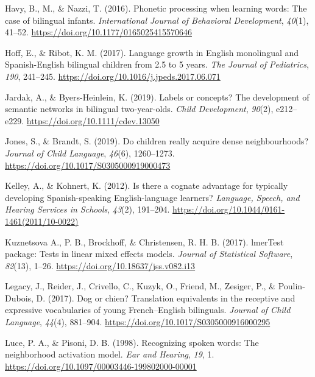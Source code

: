 \documentclass[
  ,man,floatsintext]{apa6}
\newlength{\cslhangindent}
\newlength{\cslentryspacingunit} %
\newenvironment{CSLReferences}[2] %
 {%
  \setlength{\parindent}{0pt}
  \ifodd #1
  \let\oldpar\par
  \def\par{\hangindent=\cslhangindent\oldpar}
  \fi
  \setlength{\parskip}{#2\cslentryspacingunit}
 }%
 {}
\begin{document}
\begin{CSLReferences}{1}{0}
\leavevmode{}%
Havy, B., M., \& Nazzi, T. (2016). Phonetic processing when learning words: The case of bilingual infants. \emph{International Journal of Behavioral Development}, \emph{40}(1), 41--52. \url{https://doi.org/10.1177/0165025415570646}

\leavevmode{}%
Hoff, E., \& Ribot, K. M. (2017). Language growth in {E}nglish monolingual and {S}panish-{E}nglish bilingual children from 2.5 to 5 years. \emph{The Journal of Pediatrics}, \emph{190}, 241--245. \url{https://doi.org/10.1016/j.jpeds.2017.06.071}

\leavevmode{}%
Jardak, A., \& Byers-Heinlein, K. (2019). Labels or concepts? The development of semantic networks in bilingual two-year-olds. \emph{Child Development}, \emph{90}(2), e212--e229. \url{https://doi.org/10.1111/cdev.13050}

\leavevmode{}%
Jones, S., \& Brandt, S. (2019). Do children really acquire dense neighbourhoods? \emph{Journal of Child Language}, \emph{46}(6), 1260--1273. \url{https://doi.org/10.1017/S0305000919000473}

\leavevmode{}%
Kelley, A., \& Kohnert, K. (2012). Is there a cognate advantage for typically developing {S}panish-speaking {E}nglish-language learners? \emph{Language, Speech, and Hearing Services in Schools}, \emph{43}(2), 191--204. \url{https://doi.org/10.1044/0161-1461(2011/10-0022)}

\leavevmode{}%
Kuznetsova A., P. B., Brockhoff, \& Christensen, R. H. B. (2017). lmerTest package: Tests in linear mixed effects models. \emph{Journal of Statistical Software}, \emph{82}(13), 1--26. \url{https://doi.org/10.18637/jss.v082.i13}

\leavevmode{}%
Legacy, J., Reider, J., Crivello, C., Kuzyk, O., Friend, M., Zesiger, P., \& Poulin-Dubois, D. (2017). Dog or chien? Translation equivalents in the receptive and expressive vocabularies of young {F}rench--{E}nglish bilinguals. \emph{Journal of Child Language}, \emph{44}(4), 881--904. \url{https://doi.org/10.1017/S0305000916000295}

\leavevmode{}%
Luce, P. A., \& Pisoni, D. B. (1998). Recognizing spoken words: The neighborhood activation model. \emph{Ear and Hearing}, \emph{19}, 1. \url{https://doi.org/10.1097/00003446-199802000-00001}


\end{CSLReferences}
\end{document}
